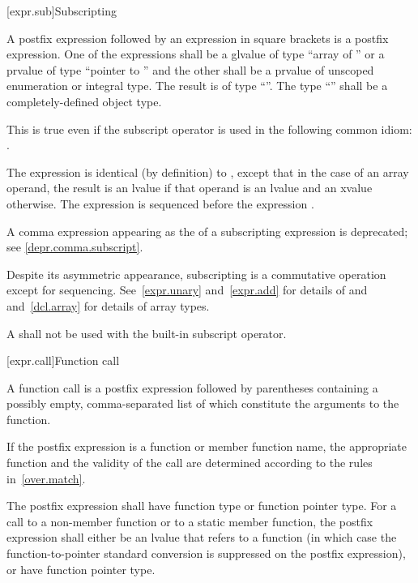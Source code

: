 [expr.sub]{Subscripting}

\pnum
{}%
%
A postfix expression followed by an expression in square brackets is a
postfix expression. One of the expressions shall be a glvalue of type ``array of
'' or a prvalue of type ``pointer
to '' and the other shall be a prvalue of unscoped enumeration or integral type.
The result is of type ``''.
%
The type ``'' shall be a completely-defined object type.%
\begin{footnote}
This
is true even if the subscript operator is used in the following common idiom:
.
\end{footnote}
The expression  is identical (by definition) to
,
except that in the case of an array operand, the result is an lvalue
if that operand is an lvalue and an xvalue otherwise.
The expression  is sequenced before the expression .

\pnum
A comma expression
appearing as the 
of a subscripting expression is deprecated;
see \ref{depr.comma.subscript}.

\pnum
\begin{note}
Despite its asymmetric appearance, subscripting is a commutative
operation except for sequencing.
See~\ref{expr.unary} and~\ref{expr.add} for details of \tcode{*} and
\tcode{+} and~\ref{dcl.array} for details of array types.
\end{note}

\pnum
A  shall not be used with the built-in subscript operator.

[expr.call]{Function call}

\pnum
{}%
%
%
A function call is a postfix expression followed by parentheses
containing a possibly empty, comma-separated list of
 which
constitute the arguments to the function.
\begin{note}
If the postfix expression is a function or member function name,
the appropriate function and the validity of the call
are determined according to the rules in~\ref{over.match}.
\end{note}
The postfix expression shall
have function type or function pointer type.
For a call to a non-member function or to a static member function,
the postfix expression shall either be an lvalue that refers to a
function (in which case the function-to-pointer standard
conversion is suppressed on the postfix expression),
or have function pointer type.

